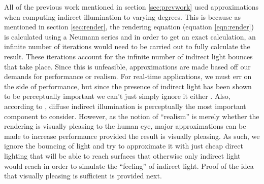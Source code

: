 All of the previous work mentioned in section \ref{sec:prevwork} used approximations when computing indirect illumination to varying degrees.  This is because as mentioned in section \ref{sec:render}, the rendering equation (equation \ref{eqn:render}) is calculated using a Neumann series and in order to get an exact calculation, an infinite number of iterations would need to be carried out to fully calculate the result.  These iterations account for the infinite number of indirect light bounces that take place.  Since this is unfeasible, approximations are made based off our demands for performance or realism.  For real-time applications, we must err on the side of performance, but since the presence of indirect light has been shown to be perceptually important we can't just simply ignore it either \cite{Stokes2004}.  Also, according to \cite{Stokes2004}, diffuse indirect illumination is perceptually the most important component to consider.  However, as the notion of “realism” is merely whether the rendering is visually pleasing to the human eye, major approximations can be made to increase performance provided the result is visually pleasing.  As such, we ignore the bouncing of light and try to approximate it with just cheap direct lighting that will be able to reach surfaces that otherwise only indirect light would reach in order to simulate the “feeling” of indirect light.  Proof of the idea that visually pleasing is sufficient is provided next.

